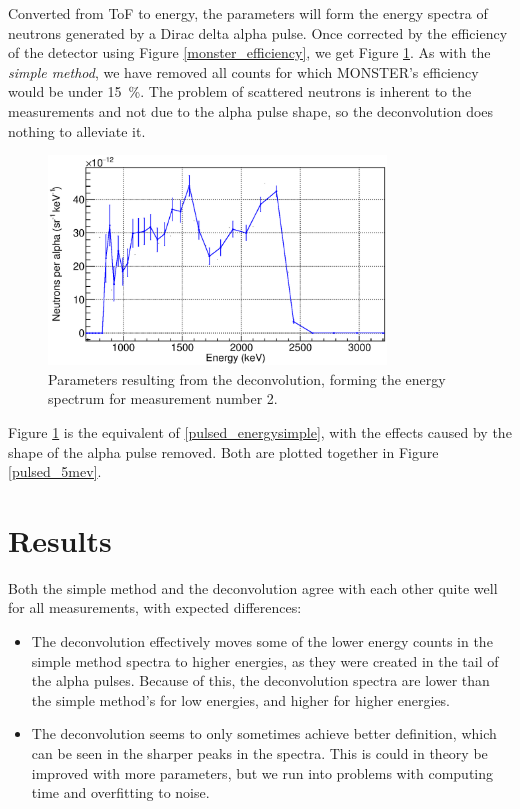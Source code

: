 \documentclass[a4paper,12pt]{report}
\begin{document}
Converted from ToF to energy, the parameters will form the energy spectra of neutrons generated by a Dirac delta alpha pulse.
Once corrected by the efficiency of the detector using Figure \ref{monster_efficiency}, we get Figure \ref{pulsed_deconvolution}.
As with the \textit{simple method}, we have removed all counts for which MONSTER's efficiency would be under \qty{15}{\percent}.
The problem of scattered neutrons is inherent to the measurements and not due to the alpha pulse shape, so the deconvolution does nothing to alleviate it.

\begin{figure}[H]
	\centering
	\includegraphics[width=0.80\textwidth]{pulsed_deconvolution.eps}
	\caption{Parameters resulting from the deconvolution, forming the energy spectrum for measurement number 2.}
	\label{pulsed_deconvolution}
\end{figure}

Figure \ref{pulsed_deconvolution} is the equivalent of \ref{pulsed_energysimple}, with the effects caused by the shape of the alpha pulse removed.
Both are plotted together in Figure \ref{pulsed_5mev}.

\section{Results}
Both the simple method and the deconvolution agree with each other quite well for all measurements, with expected differences:
\begin{itemize}
	\item The deconvolution effectively moves some of the lower energy counts in the simple method spectra to higher energies, as they were created in the tail of the alpha pulses.
		Because of this, the deconvolution spectra are lower than the simple method's for low energies, and higher for higher energies.
	\item The deconvolution seems to only sometimes achieve better definition, which can be seen in the sharper peaks in the spectra.
		This is could in theory be improved with more parameters, but we run into problems with computing time and overfitting to noise.
\end{itemize}
\end{document}
